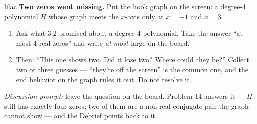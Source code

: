 \documentclass[10pt]{article}
\begin{document}
\begin{skillbox}{lilac}
    \textbf{Two zeros went missing.} Put the hook graph on the screen: a degree-4 polynomial
    $H$ whose graph meets the $x$-axis only at $x = -1$ and $x = 3$.
    \begin{enumerate}[itemsep=2pt]
        \item Ask what 3.2 promised about a degree-4 polynomial. Take the answer ``at most 4
              real zeros'' and write \textit{at most} large on the board.
        \item Then: ``This one shows two. Did it lose two? Where could they be?'' Collect two
              or three guesses --- ``they're off the screen'' is the common one, and the end
              behavior on the graph rules it out. Do not resolve it.
    \end{enumerate}
    \textit{Discussion prompt:} leave the question on the board. Problem 14 answers it ---
    $H$ still has exactly four zeros; two of them are a non-real conjugate pair the graph cannot
    show --- and the Debrief points back to it.
\end{skillbox}
\end{document}
